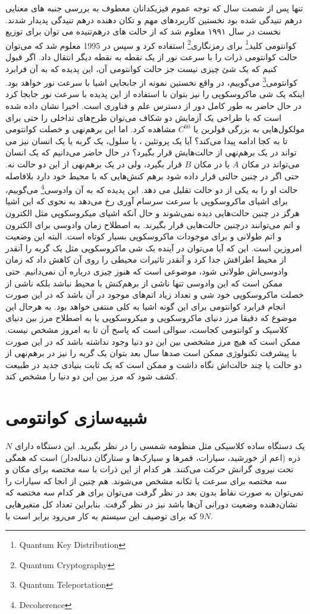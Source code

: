 تنها پس از شصت سال که
توجه عموم فیزیکدانان معطوف به بررسی جنبه های معنایی درهم تنیدگی شده بود نخستین کاربردهای مهم و تکان دهنده درهم تنیدگی پدیدار
شدند. نخست در سال ١٩٩١ معلوم شد که از حالت های درهم‌تنیده می توان برای توزیع کوانتومی کلید\footnote{Quantum Key Distribution} برای رمزنگاری\footnote{Quantum Cryptography} استفاده کرد و
سپس در 1995 معلوم شد که می‌توان حالت کوانتومی ذرات را با سرعت نور از یک نقطه به نقطه دیگر انتقال داد. اگر قبول کنیم که یک شئ
چیزی نیست جز حالت کوانتومی آن، این پدیده که به آن فرابرد کوانتومی\footnote{Quantum Teleportation} می‌گوییم، در واقع نخستین نمونه از جابجایی اشیا با سرعت نور
خواهد بود. اینکه یک شی ماکروسکوپی را نیز بتوان با استفاده از این پدیده با سرعت نور جابجا کرد در حال حاضر به طور کامل دور از دسترس
علم و فناوری است. اخیرا نشان داده شده است که با طراحی یک آزمایش دو شکاف می‌توان طرح‌های تداخلی را حتی برای مولکول‌هایی به بزرگی فولرین یا $C^{60}$ مشاهده کرد. اما این برهم‌نهی و خصلت کوانتومی تا به کجا ادامه پیدا می‌کند؟ آیا یک پروتئین ، یا سلول، یک گربه یا یک انسان نیز می تواند در یک برهم‌نهی از حالت‌هایش قرار بگیرد؟ در حال حاضر می‌دانیم که یک انسان می‌تواند در مکان $A$ یا در مکان $B$ قرار بگیرد، ولی در یک برهم‌نهی از این دو حالت نه. حتی اگر در چنین حالتی قرار داده شود برهم کنش‌هایی که با محیط خود دارد بلافاصله حالت او را به یکی از دو حالت
تقلیل می دهد. این پدیده که به آن وادوسی\footnote{Decoherence} می‌گوییم، برای اشیای ماکروسکوپی با سرعت سرسام آوری رخ می‌دهد به نحوی که این اشیا هرگز
در چنین حالت‌هایی دیده نمی‌شوند و حال آنکه اشیای میکروسکوپی مثل الکترون و اتم می‌توانند درچنین حالت‌هایی قرار بگیرند. به اصطلاح زمان
وادوسی برای الکترون و اتم طولانی و برای موجودات ماکروسکوپی بسیار کوتاه است. البته این وضعیت امروزین است. این که آیا می‌توان
در آینده یک شی ماکروسکوپی مثل یک گربه را آنقدر از محیط اطرافش جدا کرد و آنقدر تاثیرات محیطی را روی آن کاهش داد که زمان وادوسی‌اش طولانی شود، موضوعی است که هنوز چیزی درباره آن نمی‌دانیم. حتی ممکن است که این وادوسی تنها ناشی از برهم‌کنش با محیط نباشد
بلکه ناشی از خصلت ماکروسکوپی خود شی و تعداد زیاد اتم‌های موجود در آن باشد که در این صورت انجام فرابرد کوانتومی برای این گونه اشیا به کلی منتفی خواهد بود. به هرحال این موضوع که دقیقا مرز دنیای ماکروسکوپی و میکروسکوپی یا به اصطلاح مرز بین دنیای کلاسیک
و کوانتومی کجاست، سوالی است که پاسخ آن تا به امروز مشخص نیست. ممکن است که هیچ مرز مشخصی بین این دو دنیا وجود نداشته باشد که در این
صورت با پیشرفت تکنولوژی ممکن است صدها سال بعد بتوان یک گربه را نیز در برهم‌نهی از دو حالت یا چند حالت‌اش نگاه داشت و ممکن
است که یک ثابت بنیادی جدید در طبیعت کشف شود که مرز بین این دو دنیا را مشخص کند.
\section{شبیه‌سازی کوانتومی}
یک دستگاه ساده کلاسیکی مثل منظومه شمسی را در نظر بگیرید. این دستگاه دارای $N$ ذره (اعم از خورشید، سیارات، قمرها و سیارک‌ها و ستارگان دنباله‌دار) است که همگی تحت نیروی گرانش حرکت می‌کنند. هر کدام از این ذرات با سه مختصه برای مکان و سه مختصه برای سرعت
یا تکانه مشخص می‌شوند. هم چنین از انجا که سیارات را نمی‌توان به صورت نقاط بدون بعد در نظر گرفت می‌توان برای هر کدام سه مختصه که نشان‌دهنده وضعیت دورانی آن‌ها باشد نیز در نظر گرفت. بنابراین تعداد کل متغیرهایی که برای توصیف این سیستم به کار می‌رود برابر است با $9N$. 
 
